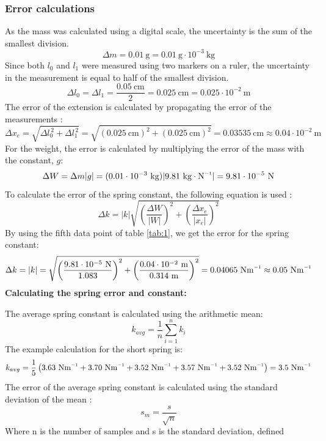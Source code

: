 \documentclass[a4paper, 10pt]{article}
\newcommand{\inv}{^{\raisebox{.2ex}{$\scriptscriptstyle-1$}}}
\newcommand{\unit}[1]{~\mathrm{#1}}
\begin{document}
\begin{justify}
\subsubsection{Error calculations}
As the mass was calculated using a digital scale, the uncertainty is the sum of
the smallest division\cite{profcomp}.
\[ \Delta m = 0.01\unit{g} = 0.01\unit{g} \cdot 10^{-3}\unit{kg}\]
Since both $l_0$ and $l_1$ were measured using two markers on a ruler, the
uncertainty in the measurement is equal to half of the smallest division\cite{profcomp}.
\[ \Delta l_0 = \Delta l_1 = \frac{0.05\unit{cm}}{2} = 0.025\unit{cm} =
0.025 \cdot 10^{-2}\unit{m} \]
The error of the extension is calculated by propagating the error of the
measurements \cite{profcomp}:
\[ \Delta x_e = \sqrt{\Delta l_0 ^{\,2} + \Delta l_1 ^{\,2}} =
\sqrt{(0.025\unit{cm})^2 + (0.025\unit{cm})^2} = 0.03535\unit{cm}
\approx 0.04 \cdot 10^{-2}\unit{m}\]
For the weight, the error is calculated by multiplying the error of the mass
with the constant, $g$:
\[\Delta W = \Delta m |g| = (0.01 \cdot 10^{-3}\unit{kg})|9.81~
\mathrm{kg \cdot N\inv}| = 9.81 \cdot 10^{-5}\unit{N}\]
To calculate the error of the spring constant, the following equation is used \cite{profcomp}:
\begin{equation}\label{eq:10}
    \Delta k = |k|\sqrt{\left(\frac{\Delta W}{|W|}\right)^2 + \left( \frac{\Delta x_e}{|x_e|}\right) ^2}
\end{equation}
By using the fifth data point of table \ref{tab:1}, we get the error for the
spring constant:
\[ \Delta k = \left| k \right| = \sqrt{\left(\frac{9.81 \cdot 10
^{-5}\unit{N}}{1.083}\right) ^ 2 + \left(\frac{0.04 \cdot 10^
{-2}\unit{m}}{0.314\unit{m}}\right) ^ 2 } = 0.04065 \unit{N m\inv}
\approx 0.05\unit{N m\inv}\]
\newpage
\textbf{Calculating the spring error and constant:}
\par
The average spring constant is calculated using the arithmetic mean:
\begin{equation}
    k_{avg} = \frac{1}{n} \sum_{i=1}^{n} k_i
\end{equation}
The example calculation for the short spring is:
\[k_{avg}  = \frac{1}{5}\left(3.63\unit{N m\inv}+ 3.70\unit{N m\inv} +
3.52\unit{N m\inv} + 3.57\unit{N m\inv} + 3.52\unit{N m\inv} \right)  =
3.5\unit{N m\inv}\]
The error of the average spring constant is calculated using the standard
deviation of the mean \cite{profcomp}:
\begin{equation}\label{eq:12}
s_m = \frac{s}{\sqrt{n}}
\end{equation}
Where n is the number of samples and s is the standard deviation, defined

\end{justify}
\end{document}

